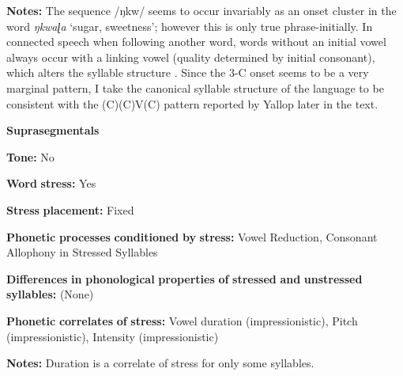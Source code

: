 \begin{styleBody}
\textbf{Notes:} The sequence /ŋkw/ seems to occur invariably as an onset cluster in the word \textit{ŋkwaɭa} ‘sugar, sweetness’; however this is only true phrase-initially. In connected speech when following another word, words without an initial vowel always occur with a linking vowel (quality determined by initial consonant), which alters the syllable structure \citep[28-30]{Yallop1977}. Since the 3-C onset seems to be a very marginal pattern, I take the canonical syllable structure of the language to be consistent with the (C)(C)V(C) pattern reported by Yallop later in the text.
\end{styleBody}

\begin{styleBody}
\textbf{Suprasegmentals}
\end{styleBody}

\begin{styleBody}
\textbf{Tone:} No
\end{styleBody}

\begin{styleBody}
\textbf{Word} \textbf{stress:} Yes
\end{styleBody}

\begin{styleBody}
\textbf{Stress} \textbf{placement:} Fixed
\end{styleBody}

\begin{styleBody}
\textbf{Phonetic} \textbf{processes} \textbf{conditioned} \textbf{by} \textbf{stress:} Vowel Reduction, Consonant Allophony in Stressed Syllables
\end{styleBody}

\begin{styleBody}
\textbf{Differences} \textbf{in} \textbf{phonological} \textbf{properties} \textbf{of} \textbf{stressed} \textbf{and} \textbf{unstressed} \textbf{syllables:} (None)
\end{styleBody}

\begin{styleBody}
\textbf{Phonetic} \textbf{correlates} \textbf{of} \textbf{stress:} Vowel duration (impressionistic), Pitch (impressionistic), Intensity (impressionistic)
\end{styleBody}

\begin{styleBody}
\textbf{Notes:} Duration is a correlate of stress for only some syllables.
\end{styleBody}


